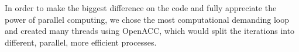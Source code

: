 In order to make the biggest difference on the code and fully appreciate the power of parallel computing, we chose the most computational demanding loop and created many threads using OpenACC, which would split the iterations into different, parallel, more efficient processes.


